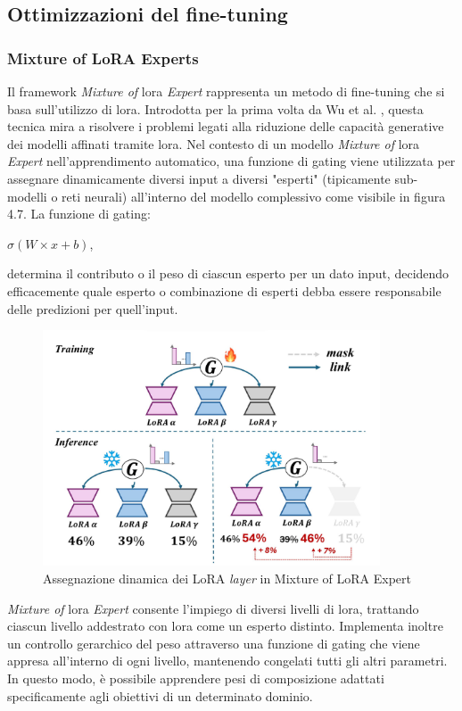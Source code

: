         \subsection{Ottimizzazioni del fine-tuning}
        \subsubsection{Mixture of LoRA Experts}
        Il framework \textit{Mixture of} \gls{lora} \textit{Expert} rappresenta un metodo di \gls{fine-tuning} che si basa sull'utilizzo di \gls{lora}. Introdotta per la prima volta da Wu et al. \cite{article:Wu2024MixtureOL}, questa tecnica mira a risolvere i problemi legati alla riduzione delle capacità generative dei modelli affinati tramite \gls{lora}.
        Nel contesto di un modello \textit{Mixture of} \gls{lora} \textit{Expert} nell'apprendimento automatico, una funzione di gating viene utilizzata per assegnare dinamicamente diversi input a diversi "esperti" (tipicamente sub-modelli o reti neurali) all'interno del modello complessivo come visibile in figura 4.7. La funzione di gating:\\
        \centerline{$ \sigma(W\times x + b)$,} determina il contributo o il peso di ciascun esperto per un dato input, decidendo efficacemente quale esperto o combinazione di esperti debba essere responsabile delle predizioni per quell'input.\\
        \begin{figure}[htp]
            \centering        
            \includegraphics[width=10cm]{img/MoE2.pdf}
            \caption{Assegnazione dinamica dei LoRA \textit{layer} in Mixture of LoRA Expert}
        \end{figure}
       \newpage\textit{Mixture of} \gls{lora} \textit{Expert} consente l'impiego di diversi livelli di \gls{lora}, trattando ciascun livello addestrato con \gls{lora} come un esperto distinto. Implementa inoltre un controllo gerarchico del peso attraverso una funzione di gating che viene appresa all'interno di ogni livello, mantenendo congelati tutti gli altri parametri. In questo modo, è possibile apprendere pesi di composizione adattati specificamente agli obiettivi di un determinato dominio.
